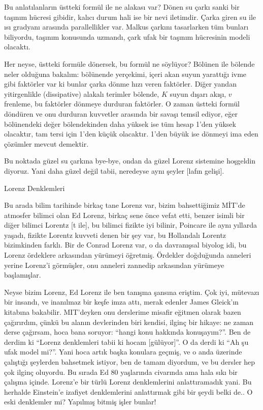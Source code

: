 \documentclass[12pt,fleqn]{article}\usepackage{../../common}
\begin{document}
Bu anlatılanların üstteki formül ile ne alakası var? Dönen su çarkı sanki
bir taşınım hücresi gibidir, kalıcı durum hali ise bir nevi
iletimdir. Çarka giren su ile ısı gradyanı arasında parallellikler
var. Malkus çarkını tasarlarken tüm bunları biliyordu, taşınım konusunda
uzmandı, çark ufak bir taşınım hücresinin modeli olacaktı.

Her neyse, üstteki formüle dönersek, bu formül ne söylüyor? Bölünen ile
bölende neler olduğuna bakalım: bölünende yerçekimi, içeri akan suyun
yarattığı ivme gibi faktörler var ki bunlar çarka dönme hızı veren
faktörler. Diğer yandan yitirgenlikle (dissipative) alakalı terimler
bölende, $K$ suyun dışarı akışı, $v$ frenleme, bu faktörler dönmeye
durduran faktörler. O zaman üstteki formül döndüren ve onu durduran
kuvvetler arasında bir savaşı temsil ediyor, eğer bölünendeki değer
bölendekinden daha yüksek ise tüm hesap 1'den yüksek olacaktır, tam tersi
için 1'den küçük olacaktır. 1'den büyük ise dönmeyi ima eden çözümler mevcut
demektir.

Bu noktada güzel su çarkına bye-bye, ondan da güzel Lorenz sistemine
hoşgeldin diyoruz. Yani daha güzel değil tabii, neredeyse aynı şeyler
[lafın gelişi]. 

Lorenz Denklemleri 

Bu arada bilim tarihinde birkaç tane Lorenz var, bizim bahsettiğimiz MİT'de
atmosfer bilimci olan Ed Lorenz, birkaç sene önce vefat etti, benzer isimli
bir diğer bilimci Lorentz [t ile], bu bilimci fizikte iyi bilinir, Poincare
ile aynı yıllarda yaşadı, fizikte Lorentz kuvveti denen bir şey var, bu
Hollandalı Lorentz bizimkinden farklı. Bir de Conrad Lorenz var, o da
davranışsal biyolog idi, bu Lorenz ördeklere arkasından yürümeyi
öğretmiş. Ördekler doğduğunda anneleri yerine Lorenz'i görmüşler, onu
anneleri zannedip arkasından yürümeye başlamışlar.

Neyse bizim Lorenz, Ed Lorenz ile ben tanışma şansına eriştim. Çok iyi,
mütevazı bir insandı, ve inanılmaz bir keşfe imza attı, merak edenler James
Gleick'ın kitabına bakabilir. MIT'deyken onu derslerime misafir eğitmen
olarak bazen çağırırdım, çünkü bu alanın devlerinden biri kendisi, ilginç
bir hikaye: ne zaman derse çağırsam, hoca bana soruyor: ``hangi konu
hakkında konuşayım?''. Ben de derdim ki ``Lorenz denklemleri tabii ki hocam
[gülüyor]''. O da derdi ki ``Ah şu ufak model mi?''. Yani hoca artık başka
konulara geçmiş, ve o anda üzerinde çalıştığı şeylerden bahsetmek istiyor,
ben de tamam diyordum, ve bu dersler hep çok ilginç oluyordu. Bu sırada Ed
80 yaşlarında civarında ama hala sıkı bir çalışma içinde. Lorenz'e bir
türlü Lorenz denklemlerini anlattıramadık yani. Bu herhalde Einstein'e
izafiyet denklemlerini anlattırmak gibi bir şeydi belki de.. O eski
denklemler mi?  Yapılmış bitmiş işler bunlar!
\end{document}
